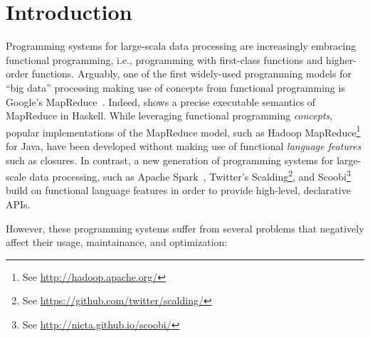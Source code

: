 \documentclass{easychair}
\begin{document}
\section{Introduction}
\label{sec:introduction}

Programming systems for large-scala data processing are increasingly embracing
functional programming, i.e., programming with first-class functions and
higher-order functions. Arguably, one of the first widely-used programming
models for ``big data'' processing making use of concepts from functional
programming is Google's MapReduce~\cite{DeanG08}. Indeed, \cite{Lammel08}
shows a precise executable semantics of MapReduce in Haskell. While leveraging
functional programming \emph{concepts}, popular implementations of the
MapReduce model, such as Hadoop MapReduce\footnote{See \url{http://hadoop.apache.org/}}
for Java, have been developed without making
use of functional \emph{language features} such as closures. In contrast, a new generation
of programming systems for large-scale data processing, such as
Apache Spark~\cite{Zaharia2012},
Twitter's Scalding\footnote{See \url{https://github.com/twitter/scalding/}},
and Scoobi\footnote{See \url{http://nicta.github.io/scoobi/}} build on functional
language features in order to provide high-level, declarative APIs.

However, these programming systems suffer from several problems that
negatively affect their usage, maintainance, and optimization:
\end{document}
